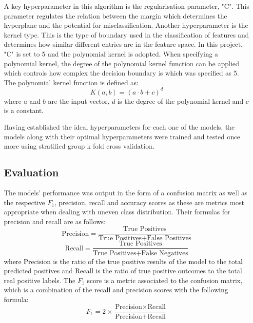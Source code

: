 \documentclass{l4proj}
\begin{document}
\begin{itemize}
A key hyperparameter in this algorithm is the regularisation parameter, "C". This parameter regulates the relation between the margin which determines the hyperplane and the potential for misclassification.
Another hyperparameter is the kernel type. This is the type of boundary used in the classification of features and determines how similar different entries are in the feature space. In this project, "C" is set to 5 and the polynomial kernel is adopted. When specifying a polynomial kernel, the degree of the polynomial kernel function can be applied which controls how complex the decision boundary is which was specified as 5. The polynomial kernel function is defined as:
\begin{equation}
K(a, b) = (a \cdot b + c)^d
\end{equation}
where $a$ and $b$ are the input vector, $d$ is the degree of the polynomial kernel and $c$ is a constant.
\end{itemize}

Having established the ideal hyperparameters for each one of the models, the models along with their optimal hyperparameters were trained and tested once more using stratified group k fold cross validation.

\subsection{Evaluation}\label{sec:Design_ML_eval}

The models’ performance was output in the form of a confusion matrix as well as the respective $F_1$, precision, recall and accuracy scores as these are metrics most appropriate when dealing with uneven class distribution. Their formulas for precision and recall are as follows:
\begin{equation}
\text{Precision} = \frac{\text{True Positives}}{\text{True Positives} + \text{False Positives}}
\end{equation}
\begin{equation}
\text{Recall} = \frac{\text{True Positives}}{\text{True Positives} + \text{False Negatives}}
\end{equation}
where $\text{Precision}$ is the ratio of the true positive results of the model to the total predicted positives and $\text{Recall}$ is the ratio of true positive outcomes to the total real positive labels. 
The $F_1$ score is a metric associated to the confusion matrix, which is a combination of the recall and precision scores with the following formula:
\begin{equation}
\text{$F_1$}= 2 \times \frac{\text{Precision} \times \text{Recall}}{\text{Precision} + \text{Recall}}
\end{equation}
\end{document}
